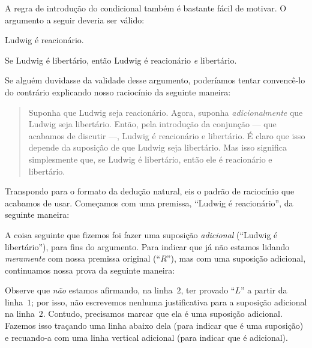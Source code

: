 A regra de introdução do condicional também é bastante fácil de motivar. O argumento a seguir deveria ser válido:
	\begin{earg}
		\item Ludwig é reacionário.
		\item[\texttherefore] Se Ludwig é libertário, então Ludwig é reacionário \emph{e} libertário.
	\end{earg}
Se alguém duvidasse da validade desse argumento, poderíamos tentar convencê-lo do contrário explicando nosso raciocínio da seguinte maneira:
	\begin{quote}
		Suponha que Ludwig seja reacionário. Agora, suponha \emph{adicionalmente} que Ludwig seja libertário. Então, pela introdução da conjunção — que acabamos de discutir —, Ludwig é reacionário e libertário. É claro que isso depende da suposição de que Ludwig seja libertário. Mas isso significa simplesmente que, se Ludwig é libertário, então ele é reacionário e libertário.
	\end{quote}
Transpondo para o formato da dedução natural, eis o padrão de raciocínio que acabamos de usar. Começamos com uma premissa, \textquotedblleft{}Ludwig é reacionário\textquotedblright{}, da seguinte maneira:
	\begin{fitchproof}
		\PR
	\end{fitchproof}
A coisa seguinte que fizemos foi fazer uma suposição \emph{adicional} (\textquotedblleft{}Ludwig é libertário\textquotedblright{}), para fins do argumento. Para indicar que já não estamos lidando \emph{meramente} com nossa premissa original (\textquotedblleft$R$\textquotedblright{}), mas com uma suposição adicional, continuamos nossa prova da seguinte maneira:
	\begin{fitchproof}
		\hypo{r}{R}\PR
		\open
			\hypo{l}{L}\AS
	\end{fitchproof}
Observe que \emph{não} estamos afirmando, na linha~$2$, ter provado
\textquotedblleft$L$\textquotedblright{} a partir da linha~$1$; por isso, não escrevemos nenhuma justificativa para a
suposição adicional na linha~$2$. Contudo, precisamos marcar que ela
é uma suposição adicional. Fazemos isso traçando uma linha abaixo dela
(para indicar que é uma suposição) e recuando-a com uma linha
vertical adicional (para indicar que é adicional).


